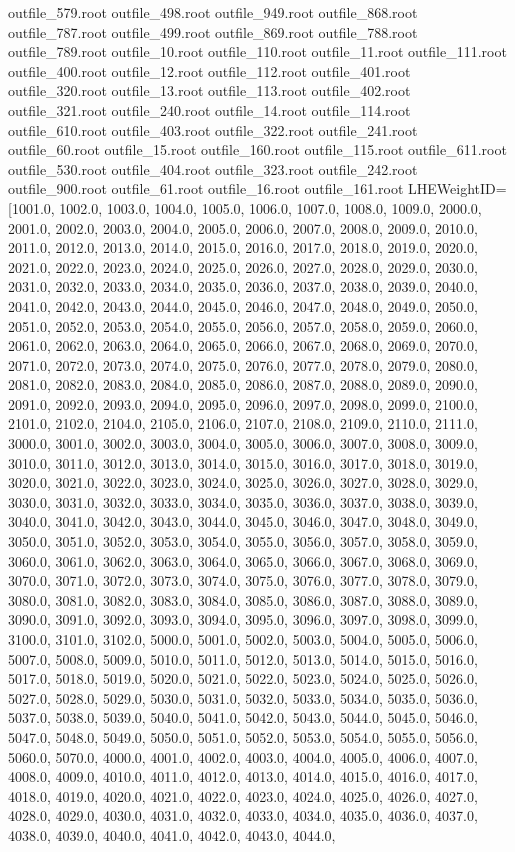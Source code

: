 outfile_579.root
outfile_498.root
outfile_949.root
outfile_868.root
outfile_787.root
outfile_499.root
outfile_869.root
outfile_788.root
outfile_789.root
outfile_10.root
outfile_110.root
outfile_11.root
outfile_111.root
outfile_400.root
outfile_12.root
outfile_112.root
outfile_401.root
outfile_320.root
outfile_13.root
outfile_113.root
outfile_402.root
outfile_321.root
outfile_240.root
outfile_14.root
outfile_114.root
outfile_610.root
outfile_403.root
outfile_322.root
outfile_241.root
outfile_60.root
outfile_15.root
outfile_160.root
outfile_115.root
outfile_611.root
outfile_530.root
outfile_404.root
outfile_323.root
outfile_242.root
outfile_900.root
outfile_61.root
outfile_16.root
outfile_161.root
LHEWeightID=
[1001.0, 1002.0, 1003.0, 1004.0, 1005.0, 1006.0, 1007.0, 1008.0, 1009.0, 2000.0, 2001.0, 2002.0, 2003.0, 2004.0, 2005.0, 2006.0, 2007.0, 2008.0, 2009.0, 2010.0, 2011.0, 2012.0, 2013.0, 2014.0, 2015.0, 2016.0, 2017.0, 2018.0, 2019.0, 2020.0, 2021.0, 2022.0, 2023.0, 2024.0, 2025.0, 2026.0, 2027.0, 2028.0, 2029.0, 2030.0, 2031.0, 2032.0, 2033.0, 2034.0, 2035.0, 2036.0, 2037.0, 2038.0, 2039.0, 2040.0, 2041.0, 2042.0, 2043.0, 2044.0, 2045.0, 2046.0, 2047.0, 2048.0, 2049.0, 2050.0, 2051.0, 2052.0, 2053.0, 2054.0, 2055.0, 2056.0, 2057.0, 2058.0, 2059.0, 2060.0, 2061.0, 2062.0, 2063.0, 2064.0, 2065.0, 2066.0, 2067.0, 2068.0, 2069.0, 2070.0, 2071.0, 2072.0, 2073.0, 2074.0, 2075.0, 2076.0, 2077.0, 2078.0, 2079.0, 2080.0, 2081.0, 2082.0, 2083.0, 2084.0, 2085.0, 2086.0, 2087.0, 2088.0, 2089.0, 2090.0, 2091.0, 2092.0, 2093.0, 2094.0, 2095.0, 2096.0, 2097.0, 2098.0, 2099.0, 2100.0, 2101.0, 2102.0, 2104.0, 2105.0, 2106.0, 2107.0, 2108.0, 2109.0, 2110.0, 2111.0, 3000.0, 3001.0, 3002.0, 3003.0, 3004.0, 3005.0, 3006.0, 3007.0, 3008.0, 3009.0, 3010.0, 3011.0, 3012.0, 3013.0, 3014.0, 3015.0, 3016.0, 3017.0, 3018.0, 3019.0, 3020.0, 3021.0, 3022.0, 3023.0, 3024.0, 3025.0, 3026.0, 3027.0, 3028.0, 3029.0, 3030.0, 3031.0, 3032.0, 3033.0, 3034.0, 3035.0, 3036.0, 3037.0, 3038.0, 3039.0, 3040.0, 3041.0, 3042.0, 3043.0, 3044.0, 3045.0, 3046.0, 3047.0, 3048.0, 3049.0, 3050.0, 3051.0, 3052.0, 3053.0, 3054.0, 3055.0, 3056.0, 3057.0, 3058.0, 3059.0, 3060.0, 3061.0, 3062.0, 3063.0, 3064.0, 3065.0, 3066.0, 3067.0, 3068.0, 3069.0, 3070.0, 3071.0, 3072.0, 3073.0, 3074.0, 3075.0, 3076.0, 3077.0, 3078.0, 3079.0, 3080.0, 3081.0, 3082.0, 3083.0, 3084.0, 3085.0, 3086.0, 3087.0, 3088.0, 3089.0, 3090.0, 3091.0, 3092.0, 3093.0, 3094.0, 3095.0, 3096.0, 3097.0, 3098.0, 3099.0, 3100.0, 3101.0, 3102.0, 5000.0, 5001.0, 5002.0, 5003.0, 5004.0, 5005.0, 5006.0, 5007.0, 5008.0, 5009.0, 5010.0, 5011.0, 5012.0, 5013.0, 5014.0, 5015.0, 5016.0, 5017.0, 5018.0, 5019.0, 5020.0, 5021.0, 5022.0, 5023.0, 5024.0, 5025.0, 5026.0, 5027.0, 5028.0, 5029.0, 5030.0, 5031.0, 5032.0, 5033.0, 5034.0, 5035.0, 5036.0, 5037.0, 5038.0, 5039.0, 5040.0, 5041.0, 5042.0, 5043.0, 5044.0, 5045.0, 5046.0, 5047.0, 5048.0, 5049.0, 5050.0, 5051.0, 5052.0, 5053.0, 5054.0, 5055.0, 5056.0, 5060.0, 5070.0, 4000.0, 4001.0, 4002.0, 4003.0, 4004.0, 4005.0, 4006.0, 4007.0, 4008.0, 4009.0, 4010.0, 4011.0, 4012.0, 4013.0, 4014.0, 4015.0, 4016.0, 4017.0, 4018.0, 4019.0, 4020.0, 4021.0, 4022.0, 4023.0, 4024.0, 4025.0, 4026.0, 4027.0, 4028.0, 4029.0, 4030.0, 4031.0, 4032.0, 4033.0, 4034.0, 4035.0, 4036.0, 4037.0, 4038.0, 4039.0, 4040.0, 4041.0, 4042.0, 4043.0, 4044.0, 